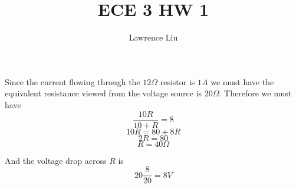 \documentclass[12pt]{article}
\title{ECE 3 HW 1}
\author{Lawrence Liu}
\begin{document}
\maketitle

Since the current flowing through the $12\Omega$ resistor is $1A$ we must have the equivalent resistance viewed from the voltage source is $20\Omega$. Therefore we must have 
$$\frac{10R}{10+R}=8$$
$$10R=80+8R$$
$$2R=80$$
$$R=\boxed{40\Omega}$$

And the voltage drop across $R$ is
$$20\frac{8}{20}=\boxed{8V}$$
\end{document}
